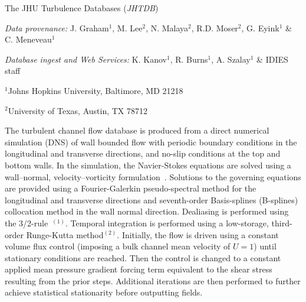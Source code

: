 \documentclass[11pt,letterpaper]{article}
\begin{document}
\begin{center}
{\LARGE {\color{jhublue} The JHU Turbulence Databases ({\it JHTDB})}} 

\vspace{0.7 cm}

\vspace{0.4 cm}

  {\it Data provenance:} J. Graham$^1$, M. Lee$^2$, N. Malaya$^2$,  R.D. Moser$^2$, G. Eyink$^1$ \& C. Meneveau$^1$
\vspace{0.1 cm}

 {\it Database ingest and Web Services:} K. Kanov$^1$, R. Burns$^1$, A. Szalay$^1$ \& IDIES staff
 \vspace{0.1 cm}
 
  $^1$Johns Hopkins University, Baltimore, MD 21218
  \vspace{0.1 cm}
  
   $^2$University of Texas, Austin, TX 78712
\end{center}
\vspace{2pt}


The turbulent channel flow database is produced from a direct numerical simulation (DNS) of wall bounded flow with periodic boundary conditions in the longitudinal and transverse directions, and no-slip conditions at the top and bottom walls.  In the simulation, the Navier-Stokes equations are solved using a wall--normal, velocity--vorticity formulation~\cite{Kim1987}. Solutions to the governing equations are provided using a Fourier-Galerkin pseudo-spectral method for the longitudinal and transverse directions and seventh-order Basis-splines (B-splines) collocation method in the wall normal direction. Dealiasing is performed using the 3/2-rule~\cite{Orszag1971}$^{(1)}$. Temporal integration is performed using a low-storage, third-order Runge-Kutta method$^{(2)}$. Initially, the flow is driven using a constant volume flux control (imposing a bulk channel mean velocity of $U=1$) until stationary conditions are reached. Then the control is changed to a constant applied mean pressure gradient forcing term equivalent to the shear stress resulting from the prior steps. Additional iterations are then performed to further achieve statistical stationarity before outputting fields. 
\end{document}
